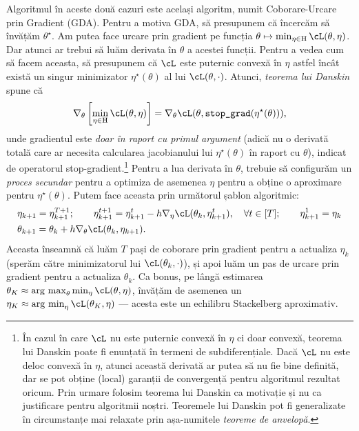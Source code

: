 \documentclass[../../book-main_ro.tex]{subfiles}
\begin{document}
Algoritmul în aceste două cazuri este același algoritm, numit Coborare-Urcare prin Gradient (GDA). Pentru a motiva GDA, să presupunem că încercăm să învățăm \(\theta^{\star}\). Am putea face urcare prin gradient pe funcția \(\theta \mapsto \min_{\eta \in \Eta}\cL(\theta, \eta)\). Dar atunci ar trebui să luăm derivata în \(\theta\) a acestei funcții. Pentru a vedea cum să facem aceasta, să presupunem că \(\cL\) este puternic convexă în \(\eta\) astfel încât există un singur minimizator \(\eta^{\star}(\theta)\) al lui \(\cL(\theta, \cdot)\). Atunci, \textit{teorema lui Danskin} spune că
\begin{equation}
    \nabla_{\theta}\bs{\min_{\eta \in \Eta}\cL(\theta, \eta)} = \nabla_{\theta}\cL(\theta, \texttt{stop\_grad}(\eta^{\star}(\theta))),
\end{equation}
unde gradientul este \textit{doar în raport cu primul argument} (adică nu o derivată totală care ar necesita calcularea jacobianului lui \(\eta^{\star}(\theta)\) în raport cu \(\theta\)), indicat de operatorul stop-gradient.\footnote{În cazul în care \(\cL\) nu este puternic convexă în \(\eta\) ci doar convexă, teorema lui Danskin poate fi enunțată în termeni de subdiferențiale. Dacă \(\cL\) nu este deloc convexă în \(\eta\), atunci această derivată ar putea să nu fie bine definită, dar se pot obține (local) garanții de convergență pentru algoritmul rezultat oricum. Prin urmare folosim teorema lui Danskin ca motivație și nu ca justificare pentru algoritmii noștri. Teoremele lui Danskin pot fi generalizate în circumstanțe mai relaxate prin așa-numitele \textit{teoreme de anvelopă}.}
Pentru a lua derivata în \(\theta\), trebuie să configurăm un \textit{proces secundar} pentru a optimiza de asemenea \(\eta\) pentru a obține o aproximare pentru \(\eta^{\star}(\theta)\). Putem face aceasta prin următorul șablon algoritmic:
\begin{align}
    &\eta_{k + 1} = \eta_{k + 1}^{T + 1}; \qquad \eta_{k + 1}^{t + 1} = \eta_{k + 1}^{t} - h \nabla_{\eta} \cL(\theta_{k}, \eta_{k + 1}^{t}), \quad \forall t \in [T]; \qquad \eta_{k + 1}^{1} = \eta_{k} \\
    &\theta_{k + 1} = \theta_{k} + h \nabla_{\theta}\cL(\theta_{k}, \eta_{k + 1}).
\end{align}
Aceasta înseamnă că luăm \(T\) pași de coborare prin gradient pentru a actualiza \(\eta_{k}\) (sperăm către minimizatorul lui \(\cL(\theta_{k}, \cdot)\)), și apoi luăm un pas de urcare prin gradient pentru a actualiza \(\theta_{k}\). Ca bonus, pe lângă estimarea \(\theta_{K} \approx \argmax_{\theta}\min_{\eta}\cL(\theta, \eta)\), învățăm de asemenea un \(\eta_{K} \approx \argmin_{\eta}\cL(\theta_{K}, \eta)\) --- acesta este un echilibru Stackelberg aproximativ.
\end{document}
